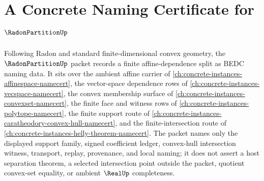 \chapter{A Concrete Naming Certificate for $\RadonPartitionUp$}
\label{ch:concrete-instances-radon-partition-namecert}

Following Radon and standard finite-dimensional convex geometry, the $\RadonPartitionUp$ packet records a finite affine-dependence split as BEDC naming data. It sits over the ambient affine carrier of \autoref{ch:concrete-instances-affinespace-namecert}, the vector-space dependence rows of \autoref{ch:concrete-instances-vecspace-namecert}, the convex membership surface of \autoref{ch:concrete-instances-convexset-namecert}, the finite face and witness rows of \autoref{ch:concrete-instances-polytope-namecert}, the finite support route of \autoref{ch:concrete-instances-caratheodory-convex-hull-namecert}, and the finite-intersection route of \autoref{ch:concrete-instances-helly-theorem-namecert}. The packet names only the displayed support family, signed coefficient ledger, convex-hull intersection witness, transport, replay, provenance, and local naming; it does not assert a host separation theorem, a selected intersection point outside the packet, quotient convex-set equality, or ambient $\RealUp$ completeness.

